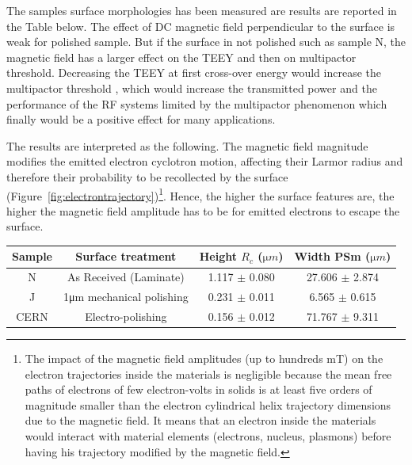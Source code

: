 The samples surface morphologies has been measured are results are reported in the Table below. The effect of DC magnetic field perpendicular to the surface is weak for polished sample. But if the surface in not polished such as sample N, the magnetic field has a larger effect on the TEEY and then on multipactor threshold. Decreasing the TEEY at first cross-over energy would increase the multipactor threshold \cite{fil2016}, which would increase the transmitted power and the performance of the RF systems limited by the multipactor phenomenon which finally would be a positive effect for many applications.

The results are interpreted as the following. The magnetic field magnitude modifies the emitted electron cyclotron motion, affecting their Larmor radius and therefore their probability to be recollected by the surface (Figure~\ref{fig:electrontrajectory})\footnote{The impact of the magnetic field amplitudes (up to hundreds \si{\milli T}) on the electron trajectories inside the materials is negligible because the mean free paths of electrons of few electron-volts in solids is at least five orders of magnitude smaller than the electron cylindrical helix trajectory dimensions due to the magnetic field. It means that an electron inside the materials would interact with material elements (electrons, nucleus, plasmons) before having his trajectory modified by the magnetic field.}. Hence, the higher the surface features are, the higher the magnetic field amplitude has to be for emitted electrons to escape the surface.

\begin{tabular}{|c|c|c|c|}
	\hline
	Sample &  Surface treatment & Height $R_c$ ($\si{\micro m}$) & Width PSm ($\si{\micro m}$) \\
	\hline
	N & As Received (Laminate) & 1.117 $\pm$ 0.080 & 27.606 $\pm$ 2.874 \\
	\hline
	J & 1\si{\micro m} mechanical polishing & 0.231 $\pm$ 0.011 & 6.565 $\pm$ 0.615 \\
	\hline
	CERN & Electro-polishing &  0.156 $\pm$ 0.012 & 71.767 $\pm$ 9.311 \\
	\hline
\end{tabular}

